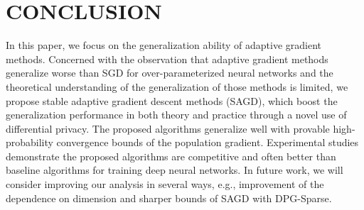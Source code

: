 \documentclass[11pt]{article}
\begin{document}
\section{CONCLUSION}
\label{sec: conclusion}
In this paper, we focus on the generalization ability of adaptive gradient methods. Concerned with the 
observation that adaptive gradient methods generalize worse than SGD for over-parameterized neural networks and the theoretical understanding of the generalization of those methods is limited,
we propose stable adaptive gradient descent methods (SAGD), which boost the generalization performance in both theory and practice through a novel use of differential privacy. The proposed algorithms generalize well with provable high-probability convergence bounds of the population gradient. Experimental studies demonstrate the proposed algorithms are competitive and often better than baseline algorithms for training deep neural networks. 
In future work, we will consider improving our analysis in several ways, e.g.,  improvement of the dependence on dimension and sharper bounds of SAGD with DPG-Sparse.



\clearpage




\clearpage


\appendix


\end{document}
